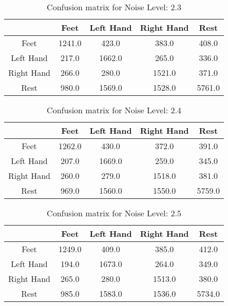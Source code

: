 \begin{table}[!htbp]
    \centering
    \begin{tabular}{|c||c|c|c|c|}
        \hline
		 & Feet & Left Hand & Right Hand & Rest \\
        \hline
        \hline
        Feet & 1241.0 & 423.0 & 383.0 & 408.0 \\
        \hline
        Left Hand & 217.0 & 1662.0 & 265.0 & 336.0 \\
        \hline
        Right Hand & 266.0 & 280.0 & 1521.0 & 371.0 \\
        \hline
        Rest & 980.0 & 1569.0 & 1528.0 & 5761.0 \\
        \hline
    \end{tabular}
    \caption{Confusion matrix for Noise Level: 2.3}
\end{table}

\begin{table}[!htbp]
    \centering
    \begin{tabular}{|c||c|c|c|c|}
        \hline
		 & Feet & Left Hand & Right Hand & Rest \\
        \hline
        \hline
        Feet & 1262.0 & 430.0 & 372.0 & 391.0 \\
        \hline
        Left Hand & 207.0 & 1669.0 & 259.0 & 345.0 \\
        \hline
        Right Hand & 260.0 & 279.0 & 1518.0 & 381.0 \\
        \hline
        Rest & 969.0 & 1560.0 & 1550.0 & 5759.0 \\
        \hline
    \end{tabular}
    \caption{Confusion matrix for Noise Level: 2.4}
\end{table}

\begin{table}[!htbp]
    \centering
    \begin{tabular}{|c||c|c|c|c|}
        \hline
		 & Feet & Left Hand & Right Hand & Rest \\
        \hline
        \hline
        Feet & 1249.0 & 409.0 & 385.0 & 412.0 \\
        \hline
        Left Hand & 194.0 & 1673.0 & 264.0 & 349.0 \\
        \hline
        Right Hand & 265.0 & 280.0 & 1513.0 & 380.0 \\
        \hline
        Rest & 985.0 & 1583.0 & 1536.0 & 5734.0 \\
        \hline
    \end{tabular}
    \caption{Confusion matrix for Noise Level: 2.5}
\end{table}

